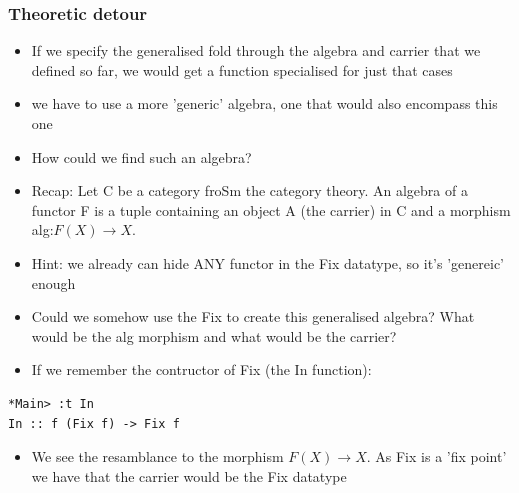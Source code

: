 \documentclass[10pt]{beamer}
\begin{document}
\begin{frame}[fragile]
\frametitle{Theoretic detour}
\begin{itemize}
\item If we specify the generalised fold through the algebra and carrier that we defined so far, we would get a function specialised for just that cases
\item we have to use a more 'generic' algebra, one that would also encompass this one	
\item How could we find such an algebra?
\item Recap: Let C be a category froSm the category theory. An algebra of a functor F is a tuple containing an object A (the carrier) in C and a morphism alg:$F(X) \rightarrow X$. 
\item Hint: we already can hide ANY functor in the Fix datatype, so it's 'genereic' enough
\item Could we somehow use the Fix to create this generalised algebra? What would be the alg morphism and what would be the carrier?
\item If we remember the contructor of Fix (the In function):	
\end{itemize}


\begin{lstlisting}
*Main> :t In
In :: f (Fix f) -> Fix f
\end{lstlisting}


\begin{itemize}
\item We see the resamblance to the morphism $F(X) \rightarrow X$. As Fix is a 'fix point' we have that the carrier would be the Fix datatype
\end{itemize}

\end{frame}
\end{document}
